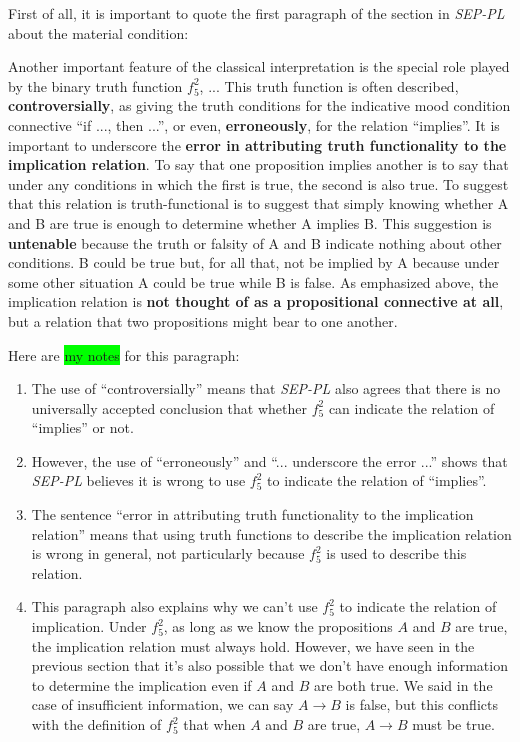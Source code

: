 \documentclass[12pt, letterpaper]{article}
\begin{document}
First of all, it is important to quote the first paragraph of the section in
\textit{SEP-PL} about the material condition:

\begin{displayquote}
  Another important feature of the classical interpretation is the special role
  played by the binary truth function $f_5^2$, ... This truth function is often
  described, \textbf{controversially}, as giving the truth conditions for the
  indicative mood condition connective ``if ..., then ...'', or even,
  \textbf{erroneously}, for the relation ``implies''. It is important to
  underscore the \textbf{error in attributing truth functionality to the
  implication relation}. To say that one proposition implies another is to say
  that under any conditions in which the first is true, the second is also
  true. To suggest that this relation is truth-functional is to suggest that
  simply knowing whether A and B are true is enough to determine whether A
  implies B. This suggestion is \textbf{untenable} because the truth or falsity
  of A and B indicate nothing about other conditions. B could be true but, for
  all that, not be implied by A because under some other situation A could be
  true while B is false. As emphasized above, the implication relation is
  \textbf{not thought of as a propositional connective at all}, but a relation
  that two propositions might bear to one another.
\end{displayquote}

Here are \colorbox{lime}{my notes} for this paragraph:
\begin{enumerate}
  \item The use of ``controversially'' means that \textit{SEP-PL} also agrees
    that there is no universally accepted conclusion that whether $f_5^2$ can
    indicate the relation of ``implies'' or not.
  \item However, the use of ``erroneously'' and ``... underscore the error ...''
    shows that \textit{SEP-PL} believes it is wrong to use $f_5^2$ to indicate
    the relation of ``implies''.
  \item The sentence ``error in attributing truth functionality to the
    implication relation'' means that using truth functions to describe the
    implication relation is wrong in general, not particularly because $f_5^2$
    is used to describe this relation.
  \item This paragraph also explains why we can't use $f_5^2$ to indicate the
    relation of implication. Under $f_5^2$, as long as we know the propositions
    $A$ and $B$ are true, the implication relation must always hold. However,
    we have seen in the previous section that it's also possible that we don't
    have enough information to determine the implication even if $A$ and $B$
    are both true. We said in the case of insufficient information, we can say
    $A \rightarrow B$ is false, but this conflicts with the definition of
    $f_5^2$ that when $A$ and $B$ are true, $A \rightarrow B$ must be true.
\end{enumerate}
\end{document}
